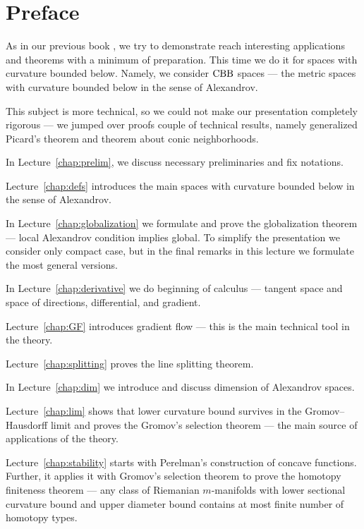 \chapter*{Preface}

As in our previous book \cite{alexander-kapovitch-petrunin-2019},
we try to demonstrate reach interesting applications and theorems with a minimum of preparation.
This time we do it for spaces with curvature bounded below.
Namely,  we consider $\mathrm{CBB}$ spaces --- the metric spaces with curvature bounded below in the sense of Alexandrov.

This subject is more technical, so we could not make our presentation completely rigorous --- we jumped over proofs couple of technical results,
namely generalized Picard's theorem and theorem about conic neighborhoods.

\medskip 

In Lecture~\ref{chap:prelim}, we discuss necessary preliminaries and fix notations.

Lecture~\ref{chap:defs} introduces the main spaces with curvature bounded below in the sense of Alexandrov.

In Lecture~\ref{chap:globalization} we formulate and prove the globalization theorem --- local Alexandrov condition implies global.
To simplify the presentation we consider only compact case,
but in the final remarks in this lecture we formulate the most general versions.

In Lecture~\ref{chap:derivative} we do beginning of calculus --- tangent space and space of directions, differential, and gradient.

Lecture~\ref{chap:GF} introduces gradient flow --- this is the main technical tool in the theory.

Lecture~\ref{chap:splitting} proves the line splitting theorem.

In Lecture~\ref{chap:dim} we introduce and discuss dimension of Alexandrov spaces.

Lecture~\ref{chap:lim} shows that lower curvature bound survives in the Gromov--Hausdorff limit and proves the Gromov's selection theorem --- the main source of applications of the theory.


Lecture~\ref{chap:stability} starts with Perelman's construction of concave functions.
Further, it applies it with Gromov's selection theorem to prove the homotopy finiteness theorem --- any class of Riemanian $m$-manifolds with lower sectional curvature bound and upper diameter bound contains at most finite number of homotopy types.

